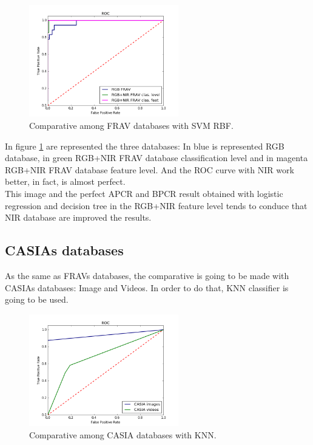 \begin{figure}[htb]
\centering
\includegraphics[width=0.58\textwidth]{images/comparative/FRAVs_SVM_RBF_ROC.png}
\caption{Comparative among FRAV databases with SVM RBF.} \label{fig:FRAVS_SVM_comparative}
\end{figure}

In figure \ref{fig:FRAVS_SVM_comparative} are represented the three databases: In blue is represented RGB database, in green RGB+NIR FRAV database classification level and in magenta RGB+NIR FRAV database feature level. And the ROC curve with NIR work better, in fact, is almost perfect.\\

This image and the perfect APCR and BPCR result obtained with logistic regression and decision tree in the RGB+NIR feature level tends to conduce that NIR database are improved the results.\\

\subsection{CASIAs databases}
As the same as FRAVs databases, the comparative is going to be made with CASIAs databases: Image and Videos. In order to do that, KNN classifier is going to be used.\\

\begin{figure}[htb]
\centering
\includegraphics[width=0.58\textwidth]{images/comparative/CASIAs_KNN_ROC.png}
\caption{Comparative among CASIA databases with KNN.} \label{fig:CASIAS_KNN_comparative}
\end{figure}


